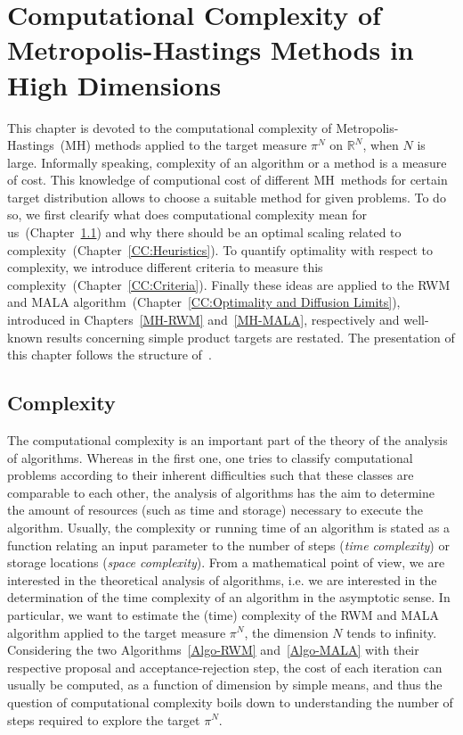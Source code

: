 \chapter[Computational Complexity]{Computational Complexity of Metropolis-Hastings Methods in High Dimensions}
\label{ch:Computational Complexity}

This chapter is devoted to the computational complexity of Metropolis-Hastings~(MH) methods applied to the target measure $ \pi^{N} $ on $ \mathbb{R}^{N} $, when $N$ is large. Informally speaking, complexity of an algorithm or a method is a measure of cost. This knowledge of computional cost of different MH~methods for certain target distribution allows to choose a suitable method for given problems. To do so, we first clearify what does computational complexity mean for us~(Chapter~\ref{CC:Complexity}) and why there should be an optimal scaling related to complexity~(Chapter~\ref{CC:Heuristics}). To quantify optimality with respect to complexity, we introduce different criteria to measure this complexity~(Chapter~\ref{CC:Criteria}). Finally these ideas are applied to the RWM and MALA algorithm~(Chapter~\ref{CC:Optimality and Diffusion Limits}), introduced in Chapters~\ref{MH-RWM} and~\ref{MH-MALA}, respectively and well-known results concerning simple product targets are restated. The presentation of this chapter follows the structure of~\autocite{Beskos2009, Roberts2001, Rosenthal2008}. 

\section{Complexity}
\label{CC:Complexity}

The computational complexity is an important part of the theory of the analysis of algorithms. Whereas in the first one, one tries to classify computational problems according to their inherent difficulties such that these classes are comparable to each other, the analysis of algorithms has the aim to determine the amount of resources (such as time and storage) necessary to execute the algorithm. Usually, the complexity or running time of an algorithm is stated as a function relating an input parameter to the number of steps (\textit{time complexity}) or storage locations (\textit{space complexity}). From a mathematical point of view, we are interested in the theoretical analysis of algorithms, i.e. we are interested in the determination of the time complexity of an algorithm in the asymptotic sense. In particular, we want to estimate the (time) complexity of the RWM and MALA algorithm applied to the target measure $ \pi^{N} $, the dimension $N$ tends to infinity. Considering the two Algorithms~\ref{Algo-RWM} and~\ref{Algo-MALA} with their respective proposal and acceptance-rejection step, the cost of each iteration can usually be computed, as a function of dimension by simple means, and thus the question of computational complexity boils down to understanding the number of steps required to explore the target $ \pi^{N} $.


